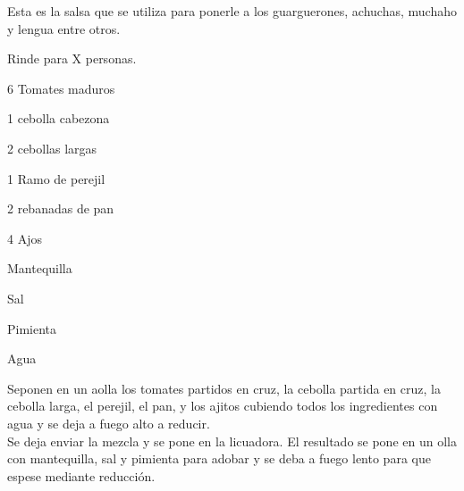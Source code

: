 Esta es la salsa que se utiliza para ponerle a los guarguerones, achuchas, muchaho y lengua entre otros.

Rinde para X personas.

\begin{ingredientes}
\item 6 Tomates maduros
\item 1 cebolla cabezona
\item 2 cebollas largas
\item 1 Ramo de perejil
\item 2 rebanadas de pan
\item 4 Ajos
\item Mantequilla
\item Sal
\item Pimienta
\item Agua
\end{ingredientes}
\preparacion
Seponen en un aolla los tomates partidos en cruz, la cebolla partida en cruz, la cebolla larga, el perejil, el pan, y los ajitos cubiendo todos los ingredientes con agua y se deja a fuego alto a reducir.\\

Se deja enviar la mezcla y se pone en la licuadora. El resultado se pone en un olla con mantequilla, sal y pimienta para adobar y se deba a fuego lento para que espese mediante reducción.\\
